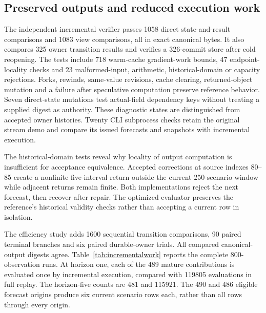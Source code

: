 \documentclass[11pt,a4paper]{article}
\theoremstyle{definition}\newtheorem{definition}[theorem]{Definition}
\begin{document}
\subsection{Preserved outputs and reduced execution work}\label{sec:incrementalresults}
The independent incremental verifier passes 1058 direct state-and-result comparisons and 1083 view comparisons, all in exact canonical bytes. It also compares 325 owner transition results and verifies a 326-commit store after cold reopening. The tests include 718 warm-cache gradient-work bounds, 47 endpoint-locality checks and 23 malformed-input, arithmetic, historical-domain or capacity rejections. Forks, rewinds, same-value revisions, cache clearing, returned-object mutation and a failure after speculative computation preserve reference behavior. Seven direct-state mutations test actual-field dependency keys without treating a supplied digest as authority. These diagnostic states are distinguished from accepted owner histories. Twenty CLI subprocess checks retain the original stream demo and compare its issued forecasts and snapshots with incremental execution.

The historical-domain tests reveal why locality of output computation is insufficient for acceptance equivalence. Accepted corrections at source indexes 80--85 create a nonfinite five-interval return outside the current 250-scenario window while adjacent returns remain finite. Both implementations reject the next forecast, then recover after repair. The optimized evaluator preserves the reference's historical validity checks rather than accepting a current row in isolation.

The efficiency study adds 1600 sequential transition comparisons, 90 paired terminal branches and six paired durable-owner trials. All compared canonical-output digests agree. Table~\ref{tab:incrementalwork} reports the complete 800-observation runs. At horizon one, each of the 489 mature contributions is evaluated once by incremental execution, compared with 119805 evaluations in full replay. The horizon-five counts are 481 and 115921. The 490 and 486 eligible forecast origins produce six current scenario rows each, rather than all rows through every origin.
\end{document}
